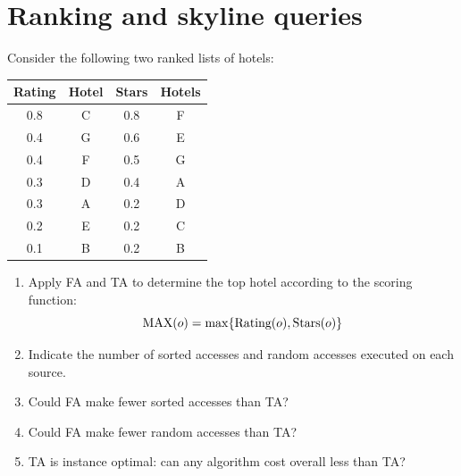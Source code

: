 \documentclass[12pt, a4paper]{report}
\begin{document}
    \newpage 

    \section{Ranking and skyline queries}
        Consider the following two ranked lists of hotels: 
        \begin{table}[H]
            \centering
            \begin{tabular}{cc|cc}
            \hline
            \textbf{Rating} & \textbf{Hotel} & \textbf{Stars} & \textbf{Hotels} \\ \hline
            0.8             & C              & 0.8            & F               \\
            0.4             & G              & 0.6            & E               \\
            0.4             & F              & 0.5            & G               \\
            0.3             & D              & 0.4            & A               \\
            0.3             & A              & 0.2            & D               \\
            0.2             & E              & 0.2            & C               \\
            0.1             & B              & 0.2            & B               \\ \hline
            \end{tabular}
        \end{table}
        \begin{enumerate}
            \item Apply FA and TA to determine the top hotel according to the scoring function: 
                \[\textnormal{MAX}(o) = \max\{\textnormal{Rating}(o), \textnormal{Stars}(o)\}\] 
            \item Indicate the number of sorted accesses and random accesses executed on each source. 
            \item Could FA make fewer sorted accesses than TA?
            \item Could FA make fewer random accesses than TA?
            \item TA is instance optimal: can any algorithm cost overall less than TA?
        \end{enumerate}
\end{document}
